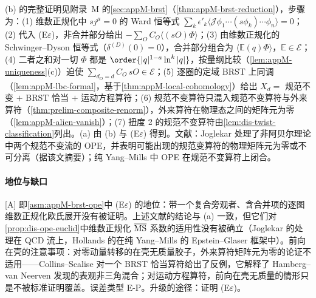 \begin{proofsketch}
(b) 的完整证明见附录~M 的\cref{sec:appM-brst}（\cref{thm:appM-brst-reduction}），步骤为：(1) 维数正规化中 $sj^\mu=0$ 的 Ward 恒等式 $\sum_k\epsilon'_k\langle\mathcal J\phi_1\cdots(s\phi_k)\cdots\phi_n\rangle=0$；(2) 代入 (E$\varepsilon$)，非合并部分给出 $-\sum_OC_O\langle(sO)\Phi\rangle$；(3) 由维数正规化的 Schwinger--Dyson 恒等式（$\delta^{(D)}(0)=0$），合并部分组合为 $\langle\mathbb E(q)\Phi\rangle$，$\mathbb E\in\mathcal E$；(4) 二者之和对一切 $\Phi$ 都是 $\order{|q|^{1-a}\ln^k|q|}$，按量纲比较（\cref{lem:appM-uniqueness}(c)）迫使 $\sum_{d_O=d}C_O\,sO\in\mathcal E$；(5) 逐圈的定域 BRST 上同调（\cref{lem:appM-lbc-formal}，基于\cref{thm:appM-local-cohomology}）给出 $X_d=$ 规范不变 $+$ BRST 恰当 $+$ 运动方程算符；(6) 规范不变算符只混入规范不变算符与外来算符（\cref{thm:prelim-composite-renorm}），外来算符在物理态之间的矩阵元为零（\cref{lem:appM-alien-vanish}）；(7) 扭度 2 的规范不变算符由\cref{lem:dis-twist-classification}列出。(a) 由 (b) 与 (E$\varepsilon$) 得到。文献：Joglekar 处理了非阿贝尔理论中两个规范不变流的 OPE，并表明可能出现的规范变算符的物理矩阵元为零或不可分离（据该文摘要）\cite{Joglekar:1976eb,Joglekar:1976pe}；纯 Yang--Mills 中 OPE 在规范不变算符上闭合\cite{Hollands:2007zg}。
\end{proofsketch}

\paragraph{地位与缺口}
[A] 即\cref{asm:appM-brst-ope}中 (E$\varepsilon$) 的地位：带一个复合旁观者、含合并项的逐图维数正规化欧氏展开没有被证明。上述文献的结论与 (a) 一致，但它们对\cref{prop:dis-ope-euclid}中维数正规化 $\overline{\rm MS}$ 系数的适用性没有被确立（Joglekar 的处理在 QCD 流上，Hollands 的在纯 Yang--Mills 的 Epstein--Glaser 框架中）。前向在壳的注意事项：对零动量转移的在壳无质量胶子，外来算符矩阵元为零的论证不适用——Collins--Scalise 对一个 BRST 恰当算符给出了反例\cite{Collins:1994ee}，它解释了 Hamberg--van Neerven 发现的表观非三角混合\cite{Hamberg:1991qt}；对运动方程算符，前向在壳无质量的情形只是不被标准证明覆盖。误差类型 E-P。升级的途径：证明 (E$\varepsilon$)。

